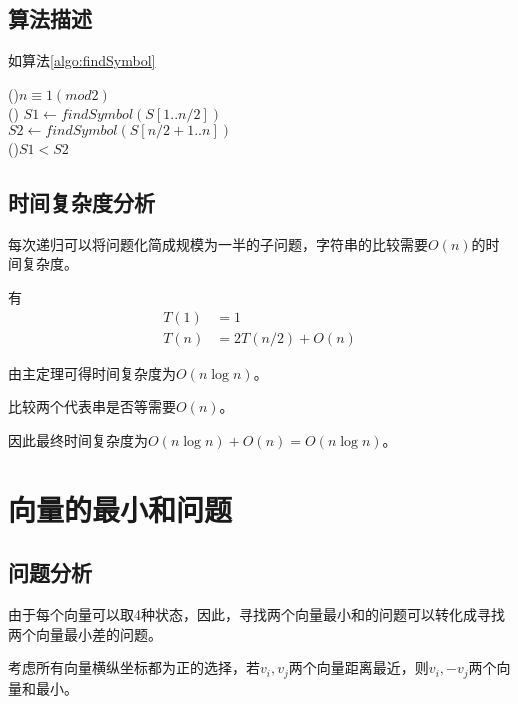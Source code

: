\subsection*{算法描述}

如算法\ref{algo:findSymbol}

\begin{algorithm}[H]
    \caption{$findSymbol(A[1..n], B[1..m],k)$}\label{algo:findSymbol}
    \If(){$n\equiv 1 (mod 2)$}{
        \\
    }\Else(){
        $S1 \leftarrow findSymbol(S[1..n/2])$\\
        $S2 \leftarrow findSymbol(S[n/2+1 .. n])$\\
        \If(){$S1 < S2$}{
        }
    }
\end{algorithm}

\subsection*{时间复杂度分析}

每次递归可以将问题化简成规模为一半的子问题，字符串的比较需要$O(n)$的时间复杂度。

有
\begin{equation}
    \begin{aligned}
        T(1) &= 1\\
        T(n) &=2T(n/2)+O(n)
    \end{aligned}
    \nonumber
\end{equation}

由主定理可得时间复杂度为$O(n \log n)$。

比较两个代表串是否等需要$O(n)$。

因此最终时间复杂度为$O(n \log n) + O(n) = O(n \log n)$。


\section{向量的最小和问题}

\subsection*{问题分析}
由于每个向量可以取4种状态，因此，寻找两个向量最小和的问题可以转化成寻找两个向量最小差的问题。

考虑所有向量横纵坐标都为正的选择，若$v_{i}, v_{j}$两个向量距离最近，则$v_{i}, -v_{j}$两个向量和最小。

